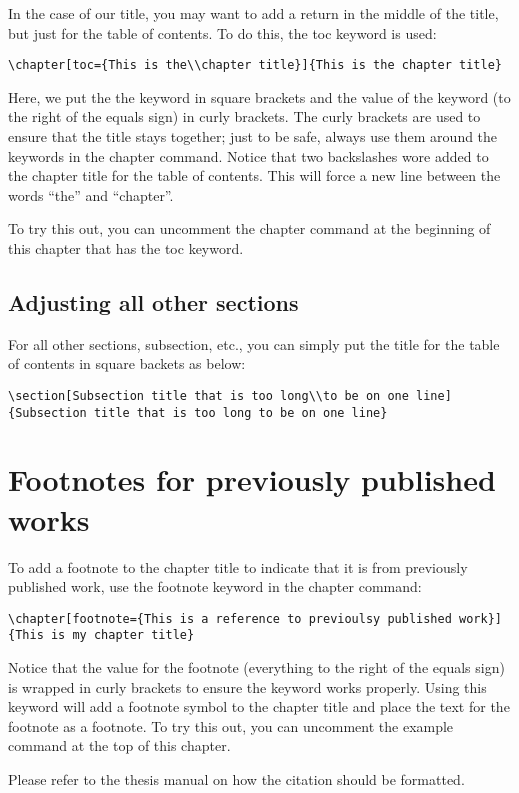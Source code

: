 In the case of our title, you may want to add a return in the middle of the title, but just for the table of contents.
To do this, the toc keyword is used:
\begin{verbatim}
\chapter[toc={This is the\\chapter title}]{This is the chapter title}
\end{verbatim}
Here, we put the the keyword in square brackets and the value of the keyword (to the right of the equals sign) in curly brackets.
The curly brackets are used to ensure that the title stays together; just to be safe, always use them around the keywords in the chapter command.
Notice that two backslashes wore added to the chapter title for the table of contents.
This will force a new line between the words ``the'' and ``chapter''.

To try this out, you can uncomment the chapter command at the beginning of this chapter that has the toc keyword.

\subsection{Adjusting all other sections}
For all other sections, subsection, etc., you can simply put the title for the table of contents in square backets as below:
\begin{verbatim}
\section[Subsection title that is too long\\to be on one line]
{Subsection title that is too long to be on one line}
\end{verbatim}

\section{Footnotes for previously published works}
To add a footnote to the chapter title to indicate that it is from previously published work, use the footnote keyword in the chapter command:
\begin{verbatim}
\chapter[footnote={This is a reference to previoulsy published work}]
{This is my chapter title}
\end{verbatim}
Notice that the value for the footnote (everything to the right of the equals sign) is wrapped in curly brackets to ensure the keyword works properly.
Using this keyword will add a footnote symbol to the chapter title and place the text for the footnote as a footnote.
To try this out, you can uncomment the example command at the top of this chapter.

Please refer to the thesis manual on how the citation should be formatted.

\vspace{4ex}
